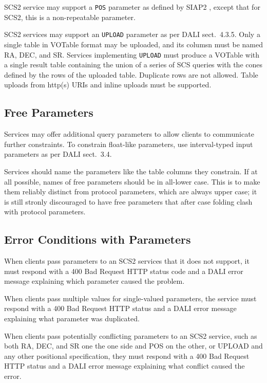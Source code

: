 \documentclass[11pt,a4paper]{ivoa}
\begin{document}
SCS2 service may support a \verb|POS| parameter as defined by SIAP2
\citep{2015ivoa.spec.1223D}, except that for SCS2, this is a
non-repeatable parameter.

SCS2 services may support an \texttt{UPLOAD} parameter as per DALI
sect.~4.3.5.  Only a single table in VOTable format may be uploaded, and
its columsn must be named RA, DEC, and SR.  Services implementing 
\verb|UPLOAD|
must produce a VOTable with a single result table containing the union
of a series of SCS queries with the cones defined by the rows of the
uploaded table.  Duplicate rows are not allowed.  Table uploads from
http(s) URIs and inline uploads must be supported.

\subsection{Free Parameters}

Services may offer additional query parameters to allow clients to
communicate further constraints.  To constrain float-like parameters,
use interval-typed input parameters as per DALI sect.~3.4.

Services should name the parameters like the table columns they
constrain.  If at all possible, names of free parameters should be in
all-lower case.  This is to make them reliably distinct from protocol
parameters, which are always upper case; it is still stronly discouraged
to have free parameters that after case folding clash with protocol
parameters.

\subsection{Error Conditions with Parameters}

When clients pass parameters to an SCS2 services that it does not support,
it must respond with a 400 Bad Request HTTP status code and a DALI error
message explaining which parameter caused the problem.

When clients pass multiple values for single-valued parameters, the
service must respond with a 400 Bad Request HTTP status and a DALI error
message explaining what parameter was duplicated.

When clients pass potentially conflicting parameters to an SCS2 service,
such as both RA, DEC, and SR one the one side and POS on the other, or
UPLOAD and any other positional specification, they must respond with a
400 Bad Request HTTP status and a DALI error message explaining what
conflict caused the error.
\end{document}
